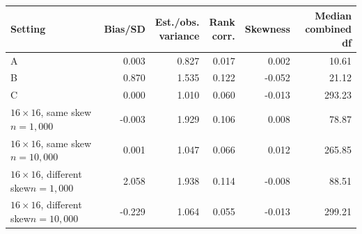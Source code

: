 \begin{tabularx}{\textwidth}{@{}>{\raggedright\arraybackslash}Xrrrrr@{}}
\toprule
Setting & Bias/SD & \shortstack{Est./obs.\\variance} & \shortstack{Rank\\corr.} & Skewness & \shortstack{Median\\combined df}\\
\midrule
A & 0.003 & 0.827 & 0.017 & 0.002 & 10.61\\
B & 0.870 & 1.535 & 0.122 & -0.052 & 21.12\\
C & 0.000 & 1.010 & 0.060 & -0.013 & 293.23\\
\(16\times16\), same skew\newline \(n=1{,}000\) & -0.003 & 1.929 & 0.106 & 0.008 & 78.87\\
\(16\times16\), same skew\newline \(n=10{,}000\) & 0.001 & 1.047 & 0.066 & 0.012 & 265.85\\
\(16\times16\), different skew\newline \(n=1{,}000\) & 2.058 & 1.938 & 0.114 & -0.008 & 88.51\\
\(16\times16\), different skew\newline \(n=10{,}000\) & -0.229 & 1.064 & 0.055 & -0.013 & 299.21\\
\bottomrule
\end{tabularx}
